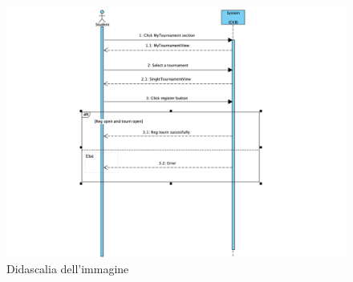     \begin{figure}[H]
  \includegraphics[width=1\linewidth]{SequenceDiagram/StudRegTourn.png} 
  \caption{Didascalia dell'immagine}
  \label{fig:immagine}
\end{figure}


